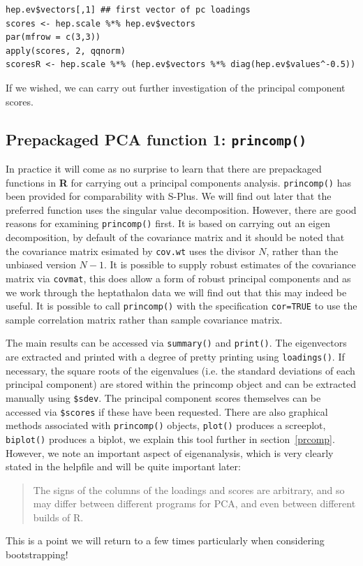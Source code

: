 \singlespacing
\begin{verbatim}
hep.ev$vectors[,1] ## first vector of pc loadings
scores <- hep.scale %*% hep.ev$vectors
par(mfrow = c(3,3))
apply(scores, 2, qqnorm)
scoresR <- hep.scale %*% (hep.ev$vectors %*% diag(hep.ev$values^-0.5))
\end{verbatim}
\onehalfspacing

If we wished, we can carry out further investigation of the principal component scores.


\subsection{Prepackaged PCA function 1: \texttt{princomp()}}

In practice it will come as no surprise to learn that there are prepackaged functions in \textbf{R} for carrying out a principal components analysis.   \verb+princomp()+ has been provided for comparability with S-Plus.  We will find out later that the preferred function uses the singular value decomposition.   However, there are good reasons for examining \verb+princomp()+ first.    It is based on carrying out an eigen decomposition, by default of the covariance matrix and it should be noted that the covariance matrix esimated by \verb+cov.wt+ uses the divisor $N$, rather than the unbiased version $N-1$.    It is possible to supply robust estimates of the covariance matrix via \verb+covmat+, this does allow a form of robust principal components and as we work through the heptathalon data we will find out that this may indeed be useful.  
It is possible to call \verb+princomp()+   with the specification \verb+cor=TRUE+ to use the sample correlation matrix rather than sample covariance matrix.

The main results can be accessed via \verb+summary()+ and \verb+print()+.   The eigenvectors are extracted and printed with a degree of pretty printing using \verb+loadings()+.   If necessary, the square roots of the eigenvalues (i.e. the standard deviations of each principal component) are stored within the princomp object and can be extracted manually using \verb+$sdev+.   The principal component scores themselves can be accessed via \verb+$scores+ if these have been requested.    There are also graphical methods associated with \verb+princomp()+ objects, \verb+plot()+ produces a screeplot, \verb+biplot()+ produces a biplot, we explain this tool further in section~\ref{prcomp}.   However, we note an important aspect of eigenanalysis, which is very clearly stated in the helpfile and will be quite important later:
\begin{quote}
The signs of the columns of the loadings and scores are arbitrary, and so may differ between different programs for PCA, and even  between different builds of R.
\end{quote}
This is a point we will return to a few times particularly when considering bootstrapping!

